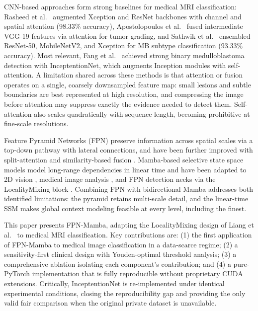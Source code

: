 \documentclass[runningheads]{llncs}
\begin{document}
CNN-based approaches form strong baselines for medical MRI classification: Rasheed et al.\ \cite{rasheed2024} augmented Xception and ResNet backbones with channel and spatial attention (98.33\% accuracy), Apostolopoulos et al.\ \cite{apostolopoulos2023} fused intermediate VGG-19 features via attention for tumor grading, and Sathwik et al.\ \cite{sathwik2024} ensembled ResNet-50, MobileNetV2, and Xception for MB subtype classification (93.33\% accuracy). Most relevant, Fang et al.\ \cite{fang2025} achieved strong binary medulloblastoma detection with InceptentionNet, which augments Inception modules with self-attention. A limitation shared across these methods is that attention or fusion operates on a single, coarsely downsampled feature map: small lesions and subtle boundaries are best represented at high resolution, and compressing the image before attention may suppress exactly the evidence needed to detect them. Self-attention also scales quadratically with sequence length, becoming prohibitive at fine-scale resolutions.

Feature Pyramid Networks (FPN) \cite{lin2017} preserve information across spatial scales via a top-down pathway with lateral connections, and have been further improved with split-attention and similarity-based fusion \cite{zhu2022}. Mamba-based selective state space models \cite{gu2023} model long-range dependencies in linear time and have been adapted to 2D vision \cite{zhu2024}, medical image analysis \cite{vmamba2024,medmamba2024}, and FPN detection necks via the LocalityMixing block \cite{liang2026}. Combining FPN with bidirectional Mamba addresses both identified limitations: the pyramid retains multi-scale detail, and the linear-time SSM makes global context modeling feasible at every level, including the finest.

This paper presents FPN-Mamba, adapting the LocalityMixing design of Liang et al.\ \cite{liang2026} to medical MRI classification. Key contributions are: (1) the first application of FPN-Mamba to medical image classification in a data-scarce regime; (2) a sensitivity-first clinical design with Youden-optimal threshold analysis; (3) a comprehensive ablation isolating each component's contribution; and (4) a pure-PyTorch implementation that is fully reproducible without proprietary CUDA extensions. Critically, InceptentionNet \cite{fang2025} is re-implemented under identical experimental conditions, closing the reproducibility gap and providing the only valid fair comparison when the original private dataset is unavailable.
\end{document}
